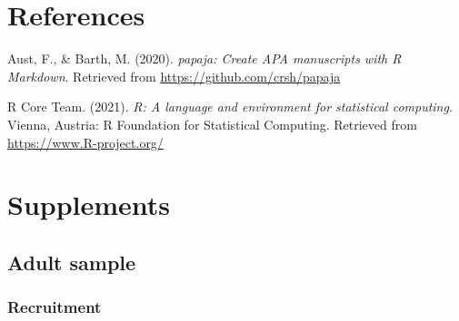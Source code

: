 \documentclass[
  english,
  man,floatsintext]{apa6}
\newlength{\cslhangindent}
\newlength{\cslentryspacingunit} %
\newenvironment{CSLReferences}[2] %
 {%
  \setlength{\parindent}{0pt}
  \ifodd #1
  \let\oldpar\par
  \def\par{\hangindent=\cslhangindent\oldpar}
  \fi
  \setlength{\parskip}{#2\cslentryspacingunit}
 }%
 {}
\begin{document}
\newpage

\hypertarget{references}{%
\section{References}\label{references}}

\begingroup
\setlength{\parindent}{-0.5in}
\setlength{\leftskip}{0.5in}

\hypertarget{refs}{}
\begin{CSLReferences}{1}{0}
\leavevmode{}%
Aust, F., \& Barth, M. (2020). \emph{{papaja}: {Create} {APA} manuscripts with {R Markdown}}. Retrieved from \url{https://github.com/crsh/papaja}

\leavevmode{}%
R Core Team. (2021). \emph{R: A language and environment for statistical computing}. Vienna, Austria: R Foundation for Statistical Computing. Retrieved from \url{https://www.R-project.org/}

\end{CSLReferences}

\endgroup

\newpage

\hypertarget{supplements}{%
\section{Supplements}\label{supplements}}

\hypertarget{adult-sample}{%
\subsection{Adult sample}\label{adult-sample}}

\hypertarget{recruitment}{%
\subsubsection{Recruitment}\label{recruitment}}
\end{document}
